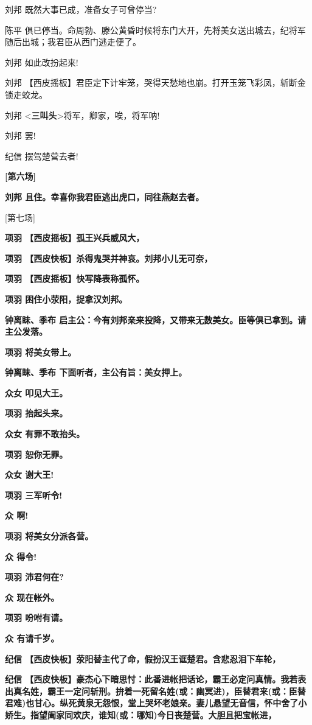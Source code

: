 刘邦 既然大事已成，准备女子可曾停当?

陈平
俱已停当。命周勃、滕公黄昏时候将东门大开，先将美女送出城去，纪将军随后出城；我君臣从西门逃走便了。

刘邦 如此改扮起来!

刘邦
【西皮摇板】君臣定下计牢笼，哭得天愁地也崩。打开玉笼飞彩凤，斩断金锁走蛟龙。

刘邦 \textless{}\textbf{三叫头}\textgreater{}将军，卿家，唉，将军呐!

刘邦 罢!

纪信 摆驾楚营去者!

\textbf{{[}第六场{]}}

\textbf{刘邦 且住。幸喜你我君臣逃出虎口，同往燕赵去者。}

{[}第七场{]}

\textbf{项羽 【西皮摇板】孤王兴兵威风大，}

\textbf{项羽 【西皮快板】杀得鬼哭并神哀。刘邦小儿无可奈，}

\textbf{项羽 【西皮摇板】快写降表称孤怀。}

\textbf{项羽 困住小荥阳，捉拿汉刘邦。}

\textbf{钟离眛、季布
启主公：今有刘邦亲来投降，又带来无数美女。臣等俱已拿到。请主公发落。}

\textbf{项羽 将美女带上。}

\textbf{钟离眛、季布 下面听者，主公有旨：美女押上。}

\textbf{众女 叩见大王。}

\textbf{项羽 抬起头来。}

\textbf{众女 有罪不敢抬头。}

\textbf{项羽 恕你无罪。}

\textbf{众女 谢大王!}

\textbf{项羽 三军听令!}

\textbf{众 啊!}

\textbf{项羽 将美女分派各营。}

\textbf{众 得令!}

\textbf{项羽 沛君何在?}

\textbf{众 现在帐外。}

\textbf{项羽 吩咐有请。}

\textbf{众 有请千岁。}

\textbf{纪信
【西皮快板】荥阳替主代了命，假扮汉王诓楚君。含悲忍泪下车轮，}

\textbf{纪信
【西皮快板】豪杰心下暗思忖：此番进帐把话论，霸王必定问真情。我若表出真名姓，霸王一定问斩刑。拚着一死留名姓(或：幽冥进)，臣替君来(或：臣替君难)也甘心。纵死黄泉无怨恨，堂上哭坏老娘亲。妻儿悬望无音信，怀中舍了小娇生。指望阖家同欢庆，谁知(或：哪知)今日丧楚营。大胆且把宝帐进，}

